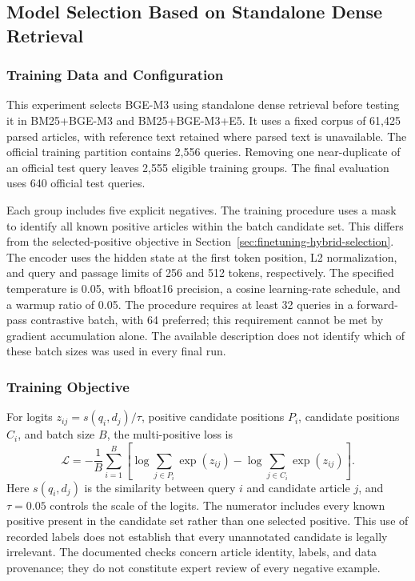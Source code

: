 \subsection{Model Selection Based on Standalone Dense Retrieval}
\label{sec:finetuning-dense-selection}

\subsubsection{Training Data and Configuration}

This experiment selects BGE-M3 using standalone dense retrieval before testing it in BM25+BGE-M3 and BM25+BGE-M3+E5. It uses a fixed corpus of 61,425 parsed articles, with reference text retained where parsed text is unavailable. The official training partition contains 2,556 queries. Removing one near-duplicate of an official test query leaves 2,555 eligible training groups. The final evaluation uses 640 official test queries.

Each group includes five explicit negatives. The training procedure uses a mask to identify all known positive articles within the batch candidate set. This differs from the selected-positive objective in Section~\ref{sec:finetuning-hybrid-selection}. The encoder uses the hidden state at the first token position, L2 normalization, and query and passage limits of 256 and 512 tokens, respectively. The specified temperature is 0.05, with bfloat16 precision, a cosine learning-rate schedule, and a warmup ratio of 0.05. The procedure requires at least 32 queries in a forward-pass contrastive batch, with 64 preferred; this requirement cannot be met by gradient accumulation alone. The available description does not identify which of these batch sizes was used in every final run.

\subsubsection{Training Objective}

For logits \(z_{ij}=s(q_i,d_j)/\tau\), positive candidate positions \(P_i\), candidate positions \(C_i\), and batch size \(B\), the multi-positive loss is
\[
\mathcal{L}=-\frac{1}{B}\sum_{i=1}^{B}\left[\log\sum_{j\in P_i}\exp(z_{ij})-\log\sum_{j\in C_i}\exp(z_{ij})\right].
\]
Here \(s(q_i,d_j)\) is the similarity between query \(i\) and candidate article \(j\), and \(\tau=0.05\) controls the scale of the logits. The numerator includes every known positive present in the candidate set rather than one selected positive. This use of recorded labels does not establish that every unannotated candidate is legally irrelevant. The documented checks concern article identity, labels, and data provenance; they do not constitute expert review of every negative example.


